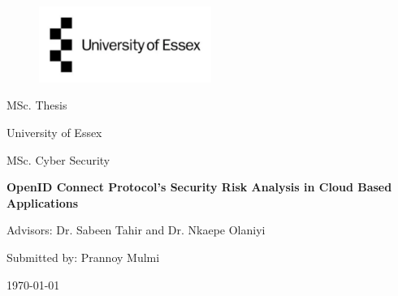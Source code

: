 
\label{titlePage}
\begin{figure}[h]
\centering
\includegraphics[width=0.50\textwidth]{pics/logo.pdf}
\end{figure}
\FloatBarrier

\begin{Large} 
\begin{center}
MSc. Thesis
\end{center}
\end{Large} 

\vspace*{5mm}

\begin{large} 
\begin{center}
University of Essex
\end{center}
\end{large} 

\begin{large} 
\begin{center}
MSc. Cyber Security
\end{center}
\end{large}



\begin{Large} 
\begin{center}
\textbf{OpenID Connect Protocol's Security Risk Analysis in Cloud Based Applications}
\end{center}
\end{Large}

\vspace*{5mm}

\begin{large} 
\begin{center}
Advisors: Dr. Sabeen Tahir and Dr. Nkaepe Olaniyi
\end{center}

\end{large} 

\begin{large} 
\begin{center}
Submitted by: Prannoy Mulmi
\end{center}
\end{large} 



\begin{center}
{\today}
\end{center}

\pagestyle{empty} %

